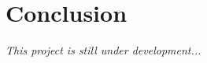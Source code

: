 \section{Conclusion}
\label{sec:hybrid:conclusion}

\textit{This project is still under development...}

